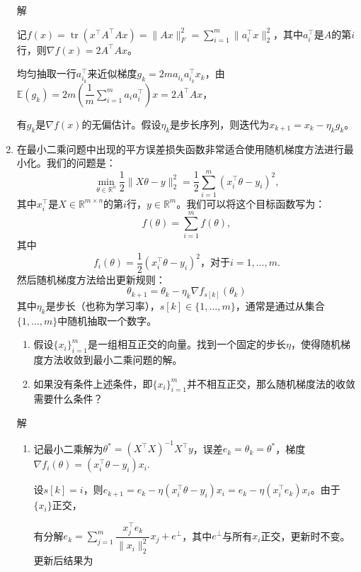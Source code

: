 \documentclass[cn,hazy,cyan,11pt,normal]{elegantnote}
\DeclareMathOperator*{\tr}{tr}
\begin{document}
\begin{enumerate}
{            \textcolor{c2}{解}

            记$f(x)=\tr(x^{\top}A^{\top}Ax)=\|Ax\|_F^2=\sum_{i=1}^m\|a_i^{\top}x\|_2^2$，其中$a_i^{\top}$是$A$的第$i$行，则$\nabla f(x)=2A^{\top}Ax$。

            均匀抽取一行$a_{i_k}^{\top}$来近似梯度$g_k=2ma_{i_k}a_{i_k}^{\top}x_k$，由$\mathbb{E}(g_k)=2m\left( \dfrac1m\sum_{i=1}^m a_i a_i^{\top}\right)x=2A^{\top}Ax$，

            有$g_k$是$\nabla f(x)$的无偏估计。假设$\eta_k$是步长序列，则迭代为$x_{k+1}=x_k-\eta_k g_k$。\vspace{0.5cm}
        }

        \item {{\color{c1}在最小二乘问题中出现的平方误差损失函数非常适合使用随机梯度方法进行最小化。我们的问题是：\[\min_{\theta\in\mathbb{R}^n}\dfrac12\|X\theta-y\|_2^2=\dfrac12\sum_{i=1}^m(x_i^{\top}\theta-y_i)^2,\]其中$x_i^{\top}$是$X\in \mathbb{R}^{m\times n}$的第$i$行，$y\in\mathbb{R}^m$。我们可以将这个目标函数写为：\[f(\theta)=\sum_{i=1}^m f(\theta),\]其中\[f_i(\theta)=\dfrac12(x_i^{\top}\theta-y_i)^2\text{，对于}i=1,\ldots,m.\]然后随机梯度方法给出更新规则：\[\theta_{k+1}=\theta_k-\eta_k\nabla f_{s[k]}(\theta_k)\]其中$\eta_k$是步长（也称为学习率），$s[k]\in\{1,\ldots,m\}$，通常是通过从集合$\{1,\ldots,m\}$中随机抽取一个数字。

            \begin{enumerate}
                \item 假设$\{x_i\}_{i=1}^m$是一组相互正交的向量。找到一个固定的步长$\eta$，使得随机梯度方法收敛到最小二乘问题的解。
                \item 如果没有条件上述条件，即$\{x_i\}_{i=1}^m$并不相互正交，那么随机梯度法的收敛需要什么条件？
            \end{enumerate}}

            \vspace{0.5cm}\textcolor{c2}{解}

            \begin{enumerate}
                \item {记最小二乘解为$\theta^{*}=(X^{\top}X)^{-1}X^{\top}y$，误差$e_k=\theta_k=\theta^{*}$，梯度$\nabla f_i(\theta)=(x_i^{\top}\theta-y_i)x_i$.

                    设$s[k]=i$，则$e_{k+1}=e_k-\eta(x_i^{\top}\theta-y_i)x_i=e_k-\eta(x_i^{\top}e_k)x_i$。由于$\{x_i\}$正交，

                    有分解$e_k=\sum_{j=1}^m \dfrac{x_j^{\top}e_k}{\|x_i\|_2^2}x_j+e^{\perp}$，其中${e^{\perp}}$与所有$x_i$正交，更新时不变。更新后结果为

}
\end{enumerate}}
\end{enumerate}
\end{document}
